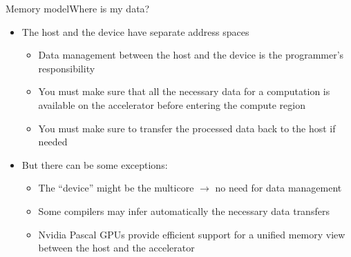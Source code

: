 \documentclass[12pt,aspectratio=169]{beamer}
\begin{document}
\begin{frame}[fragile]{Memory model}{Where is my data?}
  \begin{itemize}
  \item The host and the device have separate address spaces
    \begin{itemize}
    \item Data management between the host and the device is the programmer's responsibility
    \item You must make sure that all the necessary data for a computation is available on the accelerator before entering the compute region
    \item You must make sure to transfer the processed data back to the host if needed
    \end{itemize}
    \pause
    \vspace\baselineskip
  \item But there can be some exceptions:
    \begin{itemize}
    \item The ``device'' might be the multicore $\rightarrow$ no need for data management
    \item Some compilers may infer automatically the necessary data transfers
    \item Nvidia Pascal GPUs provide efficient support for a unified memory view between the host and the accelerator
    \end{itemize}
  \end{itemize}
\end{frame}
\end{document}

